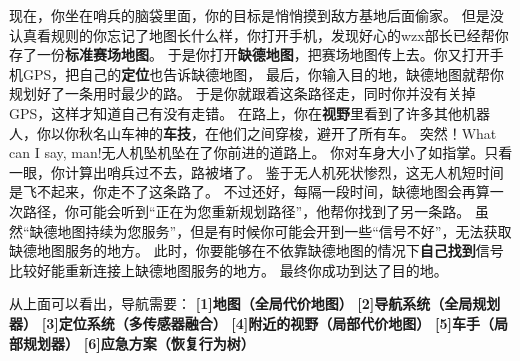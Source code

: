 现在，你坐在哨兵的脑袋里面，你的目标是悄悄摸到敌方基地后面偷家。
但是没认真看规则的你忘记了地图长什么样，你打开手机，发现好心的wzx部长已经帮你存了一份\textbf{标准赛场地图}。
于是你打开\textbf{缺德地图}，把赛场地图传上去。你又打开手机GPS，把自己的\textbf{定位}也告诉缺德地图，
最后，你输入目的地，缺德地图就帮你规划好了一条用时最少的路。
于是你就跟着这条路径走，同时你并没有关掉GPS，这样才知道自己有没有走错。
在路上，你在\textbf{视野}里看到了许多其他机器人，你以你秋名山车神的\textbf{车技}，在他们之间穿梭，避开了所有车。
突然！What can I say, man!无人机坠机坠在了你前进的道路上。
你对车身大小了如指掌。只看一眼，你计算出哨兵过不去，路被堵了。
鉴于无人机死状惨烈，这无人机短时间是飞不起来，你走不了这条路了。
不过还好，每隔一段时间，缺德地图会再算一次路径，你可能会听到“正在为您重新规划路径”，他帮你找到了另一条路。
虽然“缺德地图持续为您服务”，但是有时候你可能会开到一些“信号不好”，无法获取缺德地图服务的地方。
此时，你要能够在不依靠缺德地图的情况下\textbf{自己找到}信号比较好能重新连接上缺德地图服务的地方。
最终你成功到达了目的地。

从上面可以看出，导航需要：
\textbf{[1]地图（全局代价地图）}
\textbf{[2]导航系统（全局规划器）}
\textbf{[3]定位系统（多传感器融合）}
\textbf{[4]附近的视野（局部代价地图）}
\textbf{[5]车手（局部规划器）}
\textbf{[6]应急方案（恢复行为树）}